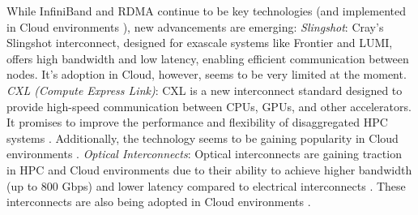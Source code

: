     While InfiniBand and RDMA continue to be key technologies (and implemented in Cloud environments \cite{maliszewski2020performance}), new advancements are emerging:
    \textit{Slingshot}: Cray's Slingshot interconnect, designed for exascale systems like Frontier and LUMI, offers high bandwidth and low latency, enabling efficient communication between nodes. It's adoption in Cloud, however, seems to be very limited at the moment.
    \textit{CXL (Compute Express Link)}: CXL is a new interconnect standard designed to provide high-speed communication between CPUs, GPUs, and other accelerators. It promises to improve the performance and flexibility of disaggregated HPC systems \cite{shan_hybrid_2022}. Additionally, the technology seems to be gaining popularity in Cloud environments \cite{10247726}.
   \textit{ Optical Interconnects}: Optical interconnects are gaining traction in HPC and Cloud environments due to their ability to achieve higher bandwidth (up to 800 Gbps) and lower latency compared to electrical interconnects \cite{michelogiannakis_case_2022, guo_understanding_2023, michelogiannakis_efficient_2023}. These interconnects are also being adopted in Cloud environments \cite{9793366}.


